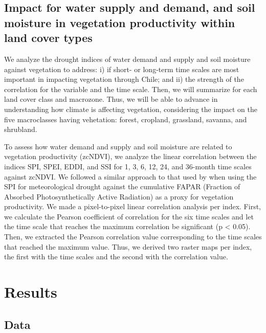 \documentclass[
  authoryear,
  preprint,
  3p,
  onecolumn]{elsarticle}
\begin{document}
\hypertarget{impact-for-water-supply-and-demand-and-soil-moisture-in-vegetation-productivity-within-land-cover-types}{%
\subsection{Impact for water supply and demand, and soil moisture in
vegetation productivity within land cover
types}\label{impact-for-water-supply-and-demand-and-soil-moisture-in-vegetation-productivity-within-land-cover-types}}

We analyze the drought indices of water demand and supply and soil
moisture against vegetation to address: i) if short- or long-term time
scales are most important in impacting vegetation through Chile; and ii)
the strength of the correlation for the variable and the time scale.
Then, we will summarize for each land cover class and macrozone. Thus,
we will be able to advance in understanding how climate is affecting
vegetation, considering the impact on the five macroclasses having
vehetation: forest, cropland, grassland, savanna, and shrubland.

To assess how water demand and supply and soil moisture are related to
vegetation productivity (zcNDVI), we analyze the linear correlation
between the indices SPI, SPEI, EDDI, and SSI for 1, 3, 6, 12, 24, and
36-month time scales against zcNDVI. We followed a similar approach to
that used by \citet{Meroni2016} when using the SPI for meteorological
drought against the cumulative FAPAR (Fraction of Absorbed
Photosynthetically Active Radiation) as a proxy for vegetation
productivity. We made a pixel-to-pixel linear correlation analysis per
index. First, we calculate the Pearson coefficient of correlation for
the six time scales and let the time scale that reaches the maximum
correlation be significant (p \textless{} 0.05). Then, we extracted the
Pearson correlation value corresponding to the time scales that reached
the maximum value. Thus, we derived two raster maps per index, the first
with the time scales and the second with the correlation value.

\hypertarget{results}{%
\section{Results}\label{results}}

\hypertarget{data-1}{%
\subsection{Data}\label{data-1}}
\end{document}
